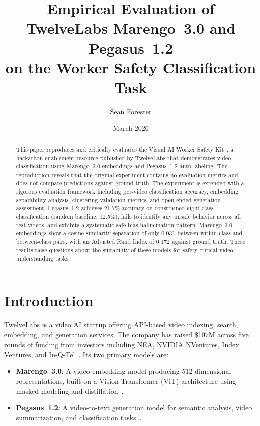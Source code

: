 \documentclass[11pt,a4paper]{article}
\title{Empirical Evaluation of TwelveLabs Marengo~3.0 and Pegasus~1.2\\on the Worker Safety Classification Task}
\author{Sean Forester}
\date{March 2026}
\begin{document}
\maketitle

\begin{abstract}
This paper reproduces and critically evaluates the Visual AI Worker Safety Kit~\cite{workersafetykit}, a hackathon enablement resource published by TwelveLabs that demonstrates video classification using Marengo~3.0 embeddings and Pegasus~1.2 auto-labeling. The reproduction reveals that the original experiment contains no evaluation metrics and does not compare predictions against ground truth. The experiment is extended with a rigorous evaluation framework including per-video classification accuracy, embedding separability analysis, clustering validation metrics, and open-ended generation assessment. Pegasus~1.2 achieves 21.7\% accuracy on constrained eight-class classification (random baseline: 12.5\%), fails to identify any unsafe behavior across all test videos, and exhibits a systematic safe-bias hallucination pattern. Marengo~3.0 embeddings show a cosine similarity separation of only 0.031 between within-class and between-class pairs, with an Adjusted Rand Index of 0.172 against ground truth. These results raise questions about the suitability of these models for safety-critical video understanding tasks.
\end{abstract}

\section{Introduction}

TwelveLabs is a video AI startup offering API-based video indexing, search, embedding, and generation services. The company has raised \$107M across five rounds of funding from investors including NEA, NVIDIA NVentures, Index Ventures, and In-Q-Tel~\cite{twelvelabs_funding}. Its two primary models are:

\begin{itemize}[nosep]
    \item \textbf{Marengo~3.0}: A video embedding model producing 512-dimensional representations, built on a Vision Transformer (ViT) architecture using masked modeling and distillation~\cite{twlv_i_paper}.
    \item \textbf{Pegasus~1.2}: A video-to-text generation model for semantic analysis, video summarization, and classification tasks~\cite{pegasus_blog}.
\end{itemize}
\end{document}
